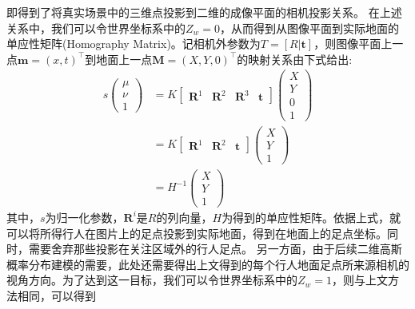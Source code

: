 即得到了将真实场景中的三维点投影到二维的成像平面的相机投影关系。
在上述关系中，我们可以令世界坐标系中的$Z_{w}=0$，从而得到从图像平面到实际地面的单应性矩阵(Homography Matrix)。记相机外参数为$T = [R|\bm{t}]$，则图像平面上一点$\bm{m}=(x,t)^\top$到地面上一点$\bm{M}=(X,Y,0)^\top$的映射关系由下式给出:
\begin{equation*}
  \begin{aligned}
    s\left(
      \begin{matrix}
        \mu \\ \nu \\ 1
      \end{matrix}
    \right)
    &=K\left[
      \begin{matrix}
        \bm{R}^{1}&\bm{R}^{2}&\bm{R}^{3}&\bm{t}
      \end{matrix}
    \right]
    \left(
      \begin{matrix}
        X \\ Y \\ 0 \\ 1
      \end{matrix}
    \right) \\
    &=K\left[
      \begin{matrix}
        \bm{R}^{1}&\bm{R}^{2}&\bm{t}
      \end{matrix}
    \right]
    \left(
      \begin{matrix}
        X \\ Y \\ 1
      \end{matrix}
    \right) \\
    &=H^{-1}
    \left(
      \begin{matrix}
        X \\ Y \\ 1
      \end{matrix}
    \right)
  \end{aligned}
\end{equation*}
其中，$s$为归一化参数，$\bm{R}^{i}$是$R$的列向量，$H$为得到的单应性矩阵。依据上式，就可以将所得行人在图片上的足点投影到实际地面，得到在地面上的足点坐标。同时，需要舍弃那些投影在关注区域外的行人足点。
另一方面，由于后续二维高斯概率分布建模的需要，此处还需要得出上文得到的每个行人地面足点所来源相机的视角方向。为了达到这一目标，我们可以令世界坐标系中的$Z_{w}=1$，则与上文方法相同，可以得到
